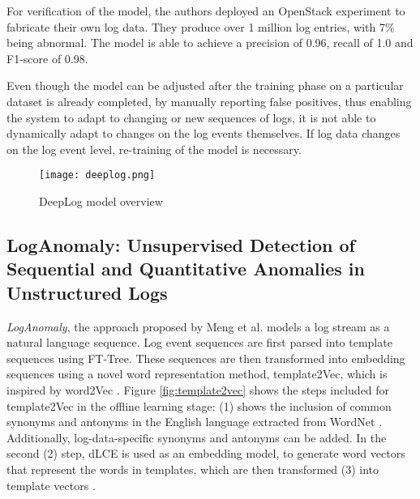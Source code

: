 For verification of the model, the authors deployed an OpenStack experiment to fabricate their own log data. They produce over 1 million log entries, with 7\% being abnormal. The model is able to achieve a precision of 0.96, recall of 1.0 and F1-score of 0.98.

Even though the model can be adjusted after the training phase on a particular dataset is already completed, by manually reporting false positives, thus enabling the system to adapt to changing or new sequences of logs, it is not able to dynamically adapt to changes on the log events themselves. If log data changes on the log event level, re-training of the model is necessary.

\begin{figure}[h]
  \centering
  \texttt{[image: deeplog.png]}\\
  \caption{DeepLog model overview \cite{graves2013speech}}
  \label{fig:deeplog}
\end{figure}


\subsection{LogAnomaly: Unsupervised Detection of Sequential and Quantitative Anomalies in Unstructured Logs \label{sec:loganomaly}}
\textit{LogAnomaly}, the approach proposed by Meng et al. \cite{meng2019loganomaly} models a log stream as a natural language sequence. Log event sequences are first parsed into template sequences using FT-Tree. These sequences are then transformed into embedding sequences using a novel word representation method, template2Vec, which is inspired by word2Vec \cite{mikolov2013distributed}. Figure \ref{fig:template2vec} shows the steps included for template2Vec in the offline learning stage: (1) shows the inclusion of common synonyms and antonyms in the English language extracted from WordNet \cite{miller1995wordnet}. Additionally, log-data-specific synonyms and antonyms can be added. In the second (2) step, dLCE \cite{nguyen2016integrating} is used as an embedding model, to generate word vectors that represent the words in templates, which are then transformed (3) into template vectors \cite{meng2019loganomaly}.

